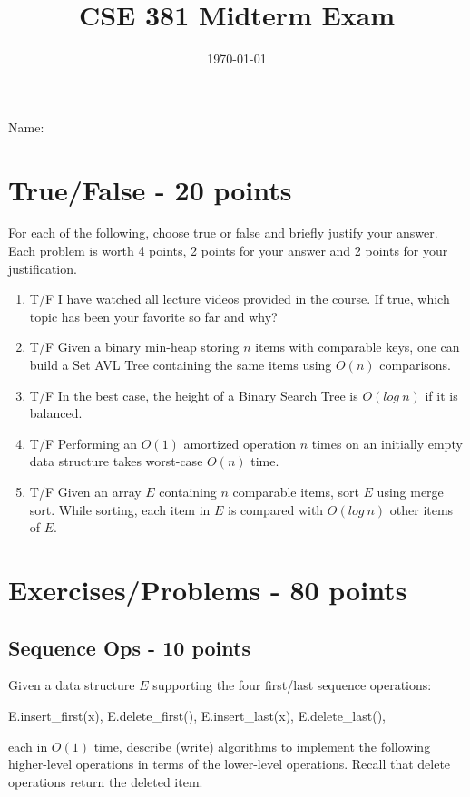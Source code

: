 \documentclass[12pt]{amsart}
\title{CSE 381 Midterm Exam}
\date{\today}
\begin{document}
\maketitle


Name: 
\\

\section{True/False - 20 points}
For each of the following, choose true or false and briefly justify your answer. Each problem is worth 4 points, 2 points for your answer and 2 points for your justification. 
\begin{enumerate} 
\item T/F I have watched all lecture videos provided in the course. If true, which topic has been your favorite so far and why? 
\item T/F Given a binary min-heap storing $n$ items with comparable keys, one can build a
Set AVL Tree containing the same items using $O(n)$ comparisons. 
\item T/F In the best case, the height of a Binary Search Tree is $O(log\:n)$ if it is balanced.
\item T/F Performing an $O(1)$ amortized operation $n$ times on an initially empty
data structure takes worst-case $O(n)$ time.
\item T/F Given an array $E$ containing $n$ comparable items, sort $E$ using merge sort. While
sorting, each item in $E$ is compared with $O(log\: n)$ other items of $E$. 
\end{enumerate}

\section{Exercises/Problems - 80 points}

\subsection{Sequence Ops - 10 points} 
Given a data structure $E$ supporting the four first/last sequence operations:
\begin{tt} E.insert\_first(x), E.delete\_first(), E.insert\_last(x), E.delete\_last(), \end{tt}
each in $O(1)$ time, describe (write) algorithms to implement the following higher-level operations in terms of the lower-level operations. Recall that delete operations return the deleted item. 
\\
\end{document}
